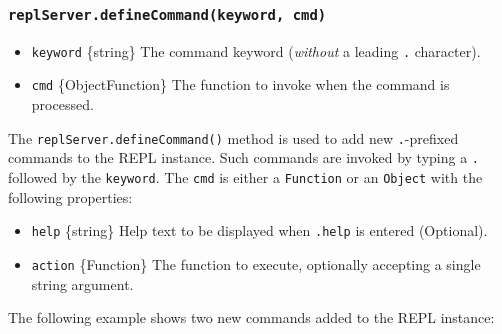 \subsubsection{\texorpdfstring{\texttt{replServer.defineCommand(keyword,\ cmd)}}{replServer.defineCommand(keyword, cmd)}}\label{replserver.definecommandkeyword-cmd}

\begin{itemize}
\tightlist
\item
  \texttt{keyword} \{string\} The command keyword (\emph{without} a
  leading \texttt{.} character).
\item
  \texttt{cmd} \{Object\textbar Function\} The function to invoke when
  the command is processed.
\end{itemize}

The \texttt{replServer.defineCommand()} method is used to add new
\texttt{.}-prefixed commands to the REPL instance. Such commands are
invoked by typing a \texttt{.} followed by the \texttt{keyword}. The
\texttt{cmd} is either a \texttt{Function} or an \texttt{Object} with
the following properties:

\begin{itemize}
\tightlist
\item
  \texttt{help} \{string\} Help text to be displayed when \texttt{.help}
  is entered (Optional).
\item
  \texttt{action} \{Function\} The function to execute, optionally
  accepting a single string argument.
\end{itemize}

The following example shows two new commands added to the REPL instance:

